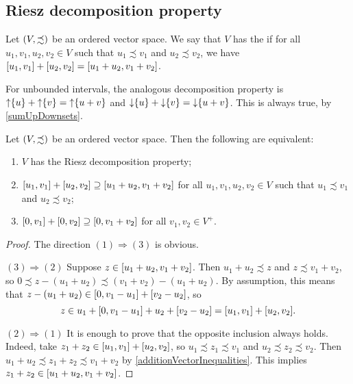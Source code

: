 \subsection{Riesz decomposition property}
\begin{definition}
Let $\sSet{V, \precsim}$ be an ordered vector space. We say that $V$ has the  if for all $u_1,v_1,u_2,v_2\in V$ such that $u_1\precsim v_1$ and $u_2\precsim v_2$, we have $\interval{u_1,v_1} + \interval{u_2,v_2} = \interval{u_1+u_2,v_1+v_2}$.
\end{definition}

For unbounded intervals, the analogous decomposition property is $\operatorname{\uparrow}\{u\} + \operatorname{\uparrow}\{v\} = \operatorname{\uparrow}\{u+v\}$ and $\operatorname{\downarrow}\{u\} + \operatorname{\downarrow}\{v\} = \operatorname{\downarrow}\{u+v\}$. This is always true, by \ref{sumUpDownsets}.

\begin{lemma} \label{RieszDecompositionLemma}
Let $\sSet{V, \precsim}$ be an ordered vector space. Then the following are equivalent:
\begin{enumerate}
\item $V$ has the Riesz decomposition property;
\item $\interval{u_1,v_1} + \interval{u_2,v_2} \supseteq \interval{u_1+u_2,v_1+v_2}$ for all $u_1,v_1,u_2,v_2\in V$ such that $u_1\precsim v_1$ and $u_2\precsim v_2$;
\item $\interval{0,v_1} + \interval{0,v_2} \supseteq \interval{0,v_1+v_2}$ for all $v_1,v_2\in V^+$.
\end{enumerate}
\end{lemma}
\begin{proof}
The direction $(1) \Rightarrow (3)$ is obvious.

$(3) \Rightarrow (2)$ Suppose $z\in \interval{u_1+u_2,v_1+v_2}$. Then $u_1+u_2 \precsim z$ and $z\precsim v_1+v_2$, so $0\precsim z - (u_1+u_2) \precsim (v_1+v_2) - (u_1+u_2)$. By assumption, this means that $z - (u_1+u_2)\in \interval{0, v_1 - u_1} + \interval{v_2 - u_2}$, so
\[ z \in u_1 + \interval{0, v_1 - u_1} + u_2 + \interval{v_2 - u_2} = \interval{u_1,v_1} + \interval{u_2,v_2}. \]

$(2) \Rightarrow (1)$ It is enough to prove that the opposite inclusion always holds. Indeed, take $z_1 + z_2 \in \interval{u_1,v_1} + \interval{u_2,v_2}$, so $u_1 \precsim z_1 \precsim v_1$ and $u_2 \precsim z_2 \precsim v_2$. Then $u_1 + u_2 \precsim z_1 + z_2 \precsim v_1 + v_2$ by \ref{additionVectorInequalities}. This implies $z_1+z_2 \in \interval{u_1+u_2,v_1+v_2}$.
\end{proof}

